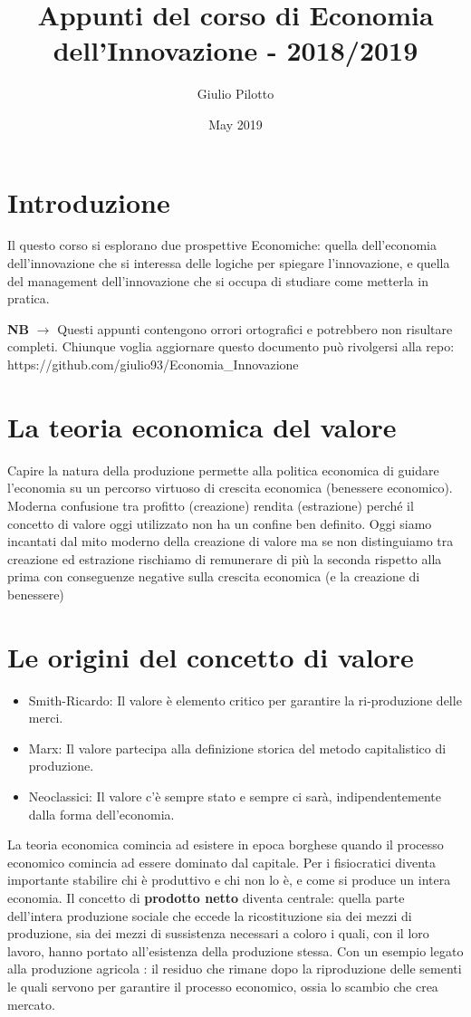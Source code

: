 \documentclass{article}
\title{Appunti del corso di Economia dell'Innovazione - 2018/2019}
\author{Giulio Pilotto}
\date{May 2019}
\begin{document}
\maketitle
\tableofcontents

\section{Introduzione}
Il questo corso si esplorano due prospettive Economiche: quella dell'economia dell'innovazione che si interessa delle logiche per spiegare l'innovazione, e quella del management dell'innovazione che si occupa di studiare come metterla in pratica.


\textbf{NB} $\rightarrow$  Questi appunti contengono orrori ortografici e potrebbero non risultare completi. Chiunque voglia aggiornare questo documento può rivolgersi alla repo: https://github.com/giulio93/Economia_Innovazione

\section{La teoria economica del valore}
Capire la natura della produzione permette alla politica economica di guidare l’economia su un percorso virtuoso di crescita economica (benessere economico).
Moderna confusione tra profitto (creazione) rendita
(estrazione) perché il concetto di valore oggi utilizzato
non ha un confine ben definito.
Oggi siamo incantati dal mito moderno della creazione
di valore ma se non distinguiamo tra creazione ed
estrazione rischiamo di remunerare di più la seconda
rispetto alla prima con conseguenze negative sulla
crescita economica (e la creazione di benessere)

\section{Le origini del concetto di valore}
\begin{itemize}
    \item Smith-Ricardo: Il valore è elemento critico per garantire la ri-produzione delle merci.
    \item Marx: Il valore
        partecipa alla definizione storica del metodo capitalistico di
        produzione.
    \item Neoclassici:  Il
valore c’è sempre stato e sempre ci sarà, indipendentemente dalla
forma dell’economia. 
\end{itemize}

La teoria economica comincia ad esistere in epoca borghese quando
il processo economico comincia ad essere dominato dal capitale. 
Per i fisiocratici diventa importante stabilire chi è produttivo e chi non lo è, e come si produce un intera economia.
Il concetto di \textbf{prodotto netto} diventa centrale: quella parte dell’intera
produzione sociale che eccede la ricostituzione sia dei mezzi di produzione, sia
dei mezzi di sussistenza necessari a coloro i quali, con il loro lavoro, hanno
portato all’esistenza della produzione stessa.
Con un esempio legato alla produzione agricola : il residuo che rimane dopo la riproduzione delle sementi le quali servono per garantire il processo economico, ossia lo scambio che crea mercato.
\end{document}

